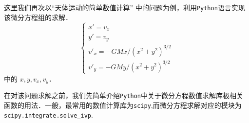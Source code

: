 这里我们再次以“天体运动的简单数值计算” 中的问题为例，利用\verb |Python|语言实现该微分方程组的求解．
\begin{equation}\label{PyIVP_eq}
\begin{cases}
x' = v_x\\
y' = v_y\\
v'_x = -GMx/(x^2 + y^2)^{3/2}\\
v'_y = -GMy/(x^2 + y^2)^{3/2}
\end{cases}
\end{equation}
中的 $x, y, v_x, v_y$．

在对该问题求解之前，我们先简单介绍\verb|Python|中关于微分方程数值求解库极相关函数的用法．一般，最常用的数值计算库为\verb|scipy|,而微分方程求解对应的模块为\verb|scipy.integrate.solve_ivp|.

